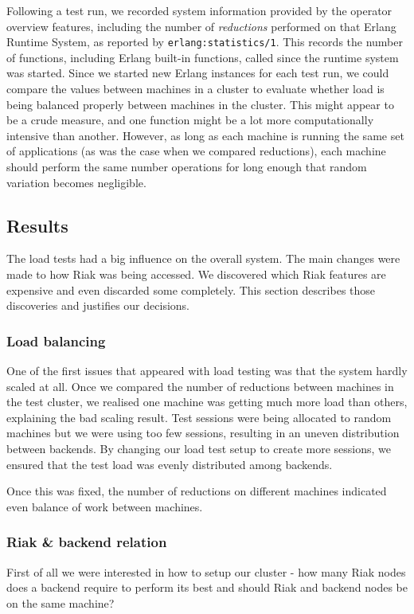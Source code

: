 \documentclass[11pt,a4paper]{report}
\begin{document}
Following a test run, we recorded system information provided by the operator
overview features, including the number of \emph{reductions} performed on that
Erlang Runtime System, as reported by {\tt erlang:statistics/1}. This records
the number of functions, including Erlang built-in functions, called
since the runtime system was started. Since we started new Erlang instances
for each test run, we could compare the values between machines in a cluster
to evaluate whether load is being balanced properly between machines in the
cluster. This might appear to be a crude measure, and one function might be a
lot more computationally intensive than another. However, as long as each machine
is running the same set of applications (as was the case when we compared
reductions), each machine should perform the same number operations for long
enough that random variation becomes negligible.

\subsection{Results}
The load tests had a big influence on the overall system.
The main changes were made to how Riak was being accessed.
We discovered which Riak features are expensive and
even discarded some completely.
This section describes those discoveries and justifies our decisions.

\subsubsection{Load balancing}\label{load_testing_balancing}
One of the first issues that appeared with load testing was that the system
hardly scaled at all. Once we compared the number of reductions between machines
in the test cluster, we realised one machine was getting much more load than
others, explaining the bad scaling result. Test sessions were being allocated to
random machines but we were using too few sessions, resulting in an uneven
distribution between backends. By changing our load test setup to create more
sessions, we ensured that the test load was evenly distributed among backends.

Once this was fixed, the number of reductions on different machines indicated
even balance of work between machines.

\subsubsection{Riak \& backend relation}
First of all we were interested in how to setup our cluster -
how many Riak nodes does a backend require to perform its best and
should Riak and backend nodes be on the same machine?
\end{document}
